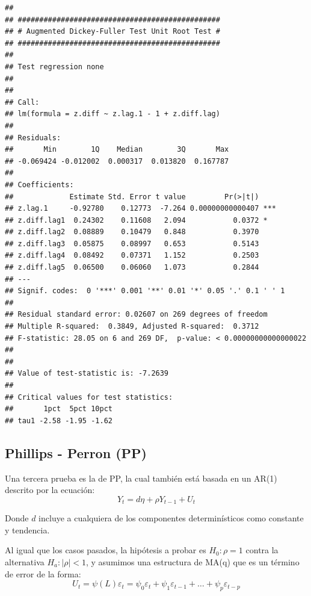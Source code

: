 \documentclass[
]{book}
\begin{document}
\begin{verbatim}
## 
## ############################################### 
## # Augmented Dickey-Fuller Test Unit Root Test # 
## ############################################### 
## 
## Test regression none 
## 
## 
## Call:
## lm(formula = z.diff ~ z.lag.1 - 1 + z.diff.lag)
## 
## Residuals:
##       Min        1Q    Median        3Q       Max 
## -0.069424 -0.012002  0.000317  0.013820  0.167787 
## 
## Coefficients:
##             Estimate Std. Error t value         Pr(>|t|)    
## z.lag.1     -0.92780    0.12773  -7.264 0.00000000000407 ***
## z.diff.lag1  0.24302    0.11608   2.094           0.0372 *  
## z.diff.lag2  0.08889    0.10479   0.848           0.3970    
## z.diff.lag3  0.05875    0.08997   0.653           0.5143    
## z.diff.lag4  0.08492    0.07371   1.152           0.2503    
## z.diff.lag5  0.06500    0.06060   1.073           0.2844    
## ---
## Signif. codes:  0 '***' 0.001 '**' 0.01 '*' 0.05 '.' 0.1 ' ' 1
## 
## Residual standard error: 0.02607 on 269 degrees of freedom
## Multiple R-squared:  0.3849, Adjusted R-squared:  0.3712 
## F-statistic: 28.05 on 6 and 269 DF,  p-value: < 0.00000000000000022
## 
## 
## Value of test-statistic is: -7.2639 
## 
## Critical values for test statistics: 
##       1pct  5pct 10pct
## tau1 -2.58 -1.95 -1.62
\end{verbatim}

\hypertarget{phillips---perron-pp}{%
\subsection{Phillips - Perron (PP)}\label{phillips---perron-pp}}

Una tercera prueba es la de PP, la cual también está basada en un AR(1) descrito por la ecuación:
\begin{equation}
    Y_t = d \eta + \rho Y_{t-1} + U_t
    \label{eq:URPP}
\end{equation}

Donde \(d\) incluye a cualquiera de los componentes determinísticos como constante y tendencia.

Al igual que los casos pasados, la hipótesis a probar es \(H_0 : \rho = 1\) contra la alternativa \(H_a : | \rho | < 1\), y asumimos una estructura de MA(q) que es un término de error de la forma:
\begin{equation}
    U_t = \psi(L) \varepsilon_t = \psi_0 \varepsilon_t + \psi_1 \varepsilon_{t-1} + \ldots + \psi_p \varepsilon_{t-p}    
\end{equation}
\end{document}
